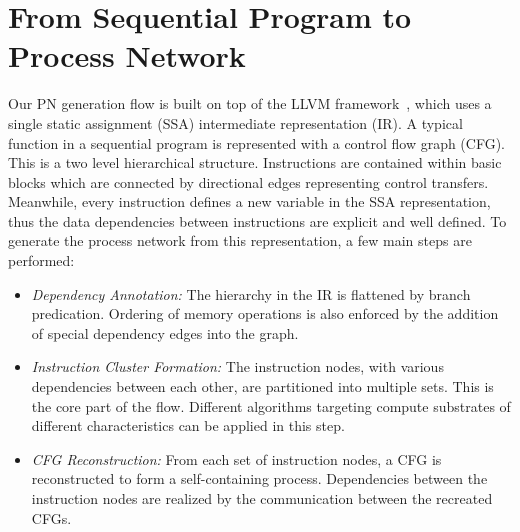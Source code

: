 \documentclass{sig-alternate}
\begin{document}
\section{From Sequential Program to Process Network}
\label{mainConvert}
Our PN generation flow is built on top of the LLVM framework~\cite{Lattner:2004:LCF:977395.977673}, which uses a single static assignment (SSA) intermediate representation (IR). 
A typical function in a sequential program is represented with
a control flow graph (CFG). This is a two level hierarchical structure. Instructions are contained within basic blocks which are connected by directional edges representing control transfers. 
Meanwhile, every instruction defines a new variable in the SSA representation, thus the data dependencies between instructions are explicit and well defined.  
To generate the process
network from this representation, a few main steps are performed:
\begin{itemize}

\item \textit{Dependency Annotation:} The hierarchy in the IR is flattened by branch predication. Ordering of memory operations is also enforced by the addition of
special dependency edges into the graph.

\item \textit{Instruction Cluster Formation:} The instruction nodes, with various dependencies between
each other, are partitioned into multiple sets. This is the core part of the flow. Different algorithms targeting compute substrates of different characteristics can be applied in this step. 

\item \textit{CFG Reconstruction:} From each set of instruction nodes, a CFG is reconstructed
to form a self-containing process. Dependencies between the instruction
nodes are realized by the communication between the recreated CFGs. 

\end{itemize}
\end{document}
